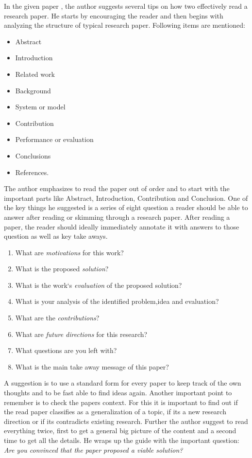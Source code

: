 \documentclass{article}
\begin{document}
  In the given paper \cite{Griswold2009}, the author suggests several tips on how two
  effectively read a research paper. He starts by encouraging the reader and then begins with analyzing  
  the structure of typical research paper. Following items are mentioned:
  \begin{itemize}
    \item Abstract
    \item Introduction
    \item Related work 
    \item Background
    \item System or model
    \item Contribution
    \item Performance or evaluation
    \item Conclusions
    \item References.
  \end{itemize}

  The author emphasizes to read the paper out of order and to start with the important parts like Abstract, 
  Introduction, Contribution and Conclusion. One of the key things he suggested is a series of eight question 
  a reader should be able to answer after reading or skimming through a research paper. After reading a paper,
  the reader should ideally immediately annotate it with answers to those question as well as key take aways.
  \begin{enumerate}
    \item What are \emph{motivations} for this work?
    \item What is the proposed \emph{solution}?
    \item What is the work`s \emph{evaluation} of the proposed solution?
    \item What is your analysis of the identified problem,idea and evaluation?
    \item What are the \emph{contributions}?
    \item What are \emph{future directions} for this research? 
    \item What questions are you left with?
    \item What is the main take away message of  this paper?
  \end{enumerate}
A suggestion is to use a standard form for every paper to keep track of the own thoughts and to be fast able to 
find ideas again. Another important point to remember is to check the papers context.
For this it is important to find out if the read paper classifies as a generalization of a topic, if its a
new research direction or if its contradicts existing research.
Further the author suggest to read everything twice, first to get a general big picture of the content and a second
time to get all the details.
He wraps up the guide with the important question: \emph{Are you convinced that the paper proposed a viable solution?}
\end{document}
